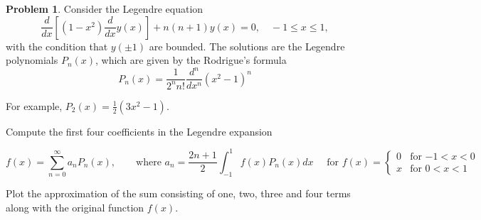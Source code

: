 \documentclass[12pt,a4paper]{article}
\theoremstyle{definition}
\newtheorem{problem}{Problem}
\theoremstyle{remark}
\begin{document}
\begin{problem}
    Consider the Legendre equation $$\frac{d}{dx} \left[ (1-x^2) \frac{d}{dx}y(x) \right] + n(n+1)y(x)=0, \quad -1 \le x \le 1,$$
    with the condition that $y(\pm 1)$ are bounded. The solutions are the Legendre polynomials $P_n(x)$, which are given by the Rodrigue's formula $$P_n(x) = \frac{1}{2^nn!} \frac{d^n}{dx^n} (x^2 - 1)^n$$

    For example, $P_2(x) = \frac{1}{2} (3x^2-1)$. 

    Compute the first four coefficients in the Legendre expansion 
    
    $$f(x) = \sum_{n=0}^\infty a_n P_n(x), \qquad \text{where } a_n = \frac{2n+1}{2} \int_{-1}^1 f(x) P_n(x) dx \quad \text{ for } f(x) = \begin{cases} 0 & \text{for $-1 < x < 0$} \\ x & \text{for $0 < x < 1$}\end{cases}$$

    Plot the approximation of the sum consisting of one, two, three and four terms along with the original function $f(x)$. 
\end{problem}
\end{document}
